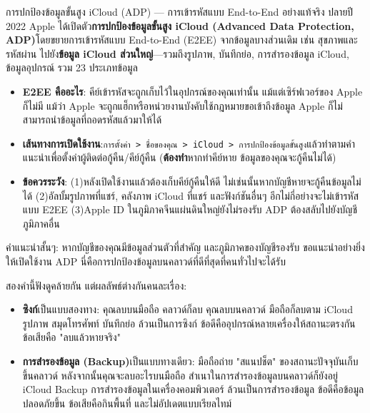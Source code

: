 \begin{tcbwarn}{การปกป้องข้อมูลขั้นสูง iCloud (ADP) — การเข้ารหัสแบบ End-to-End อย่างแท้จริง}
ปลายปี 2022 Apple ได้เปิดตัว\textbf{การปกป้องข้อมูลขั้นสูง iCloud (Advanced Data Protection, ADP)}โดยขยายการเข้ารหัสแบบ End-to-End (E2EE) จากข้อมูลบางส่วนเดิม เช่น สุขภาพและรหัสผ่าน ไปยัง\textbf{ข้อมูล iCloud ส่วนใหญ่}—รวมถึงรูปภาพ, บันทึกย่อ, การสำรองข้อมูล iCloud, ข้อมูลอุปกรณ์ รวม 23 ประเภทข้อมูล

\begin{itemize}
  \item \textbf{E2EE คืออะไร}: คีย์เข้ารหัสจะถูกเก็บไว้ในอุปกรณ์ของคุณเท่านั้น แม้แต่เซิร์ฟเวอร์ของ Apple ก็ไม่มี แม้ว่า Apple จะถูกแฮ็กหรือหน่วยงานบังคับใช้กฎหมายขอเข้าถึงข้อมูล Apple ก็ไม่สามารถนำข้อมูลที่ถอดรหัสแล้วมาให้ได้
  \item \textbf{เส้นทางการเปิดใช้งาน}:\texttt{การตั้งค่า > ชื่อของคุณ > iCloud > การปกป้องข้อมูลขั้นสูง}แล้วทำตามคำแนะนำเพื่อตั้งค่าผู้ติดต่อกู้คืน/คีย์กู้คืน (\textbf{ต้องทำ}หากทำคีย์หาย ข้อมูลของคุณจะกู้คืนไม่ได้)
  \item \textbf{ข้อควรระวัง}: (1)หลังเปิดใช้งานแล้วต้องเก็บคีย์กู้คืนให้ดี ไม่เช่นนั้นหากบัญชีหายจะกู้คืนข้อมูลไม่ได้ (2)อัลบั้มรูปภาพที่แชร์, คลังภาพ iCloud ที่แชร์ และฟังก์ชันอื่นๆ อีกไม่กี่อย่างจะไม่เข้ารหัสแบบ E2EE (3)Apple ID ในภูมิภาคจีนแผ่นดินใหญ่ยังไม่รองรับ ADP ต้องสลับไปยังบัญชีภูมิภาคอื่น
\end{itemize}

คำแนะนำสั้นๆ: หากบัญชีของคุณมีข้อมูลส่วนตัวที่สำคัญ และภูมิภาคของบัญชีรองรับ ขอแนะนำอย่างยิ่งให้เปิดใช้งาน ADP นี่คือการปกป้องข้อมูลบนคลาวด์ที่ดีที่สุดที่คนทั่วไปจะได้รับ

\end{tcbwarn}


สองคำนี้ฟังดูคล้ายกัน แต่ผลลัพธ์ต่างกันคนละเรื่อง:

\begin{itemize}
  \item \textbf{ซิงก์}เป็นแบบสองทาง: คุณลบบนมือถือ คลาวด์ก็ลบ คุณลบบนคลาวด์ มือถือก็ลบตาม iCloud รูปภาพ สมุดโทรศัพท์ บันทึกย่อ ล้วนเป็นการซิงก์ ข้อดีคืออุปกรณ์หลายเครื่องให้สถานะตรงกัน ข้อเสียคือ "ลบแล้วหายจริง"
  \item \textbf{การสำรองข้อมูล (Backup)}เป็นแบบทางเดียว: มือถือถ่าย "สแนปช็ต" ของสถานะปัจจุบันเก็บขึ้นคลาวด์ หลังจากนั้นคุณจะลบอะไรบนมือถือ สำเนาในการสำรองข้อมูลบนคลาวด์ก็ยังอยู่ iCloud Backup การสำรองข้อมูลในเครื่องคอมพิวเตอร์ ล้วนเป็นการสำรองข้อมูล ข้อดีคือข้อมูลปลอดภัยขึ้น ข้อเสียคือกินพื้นที่ และไม่อัปเดตแบบเรียลไทม์
\end{itemize}

